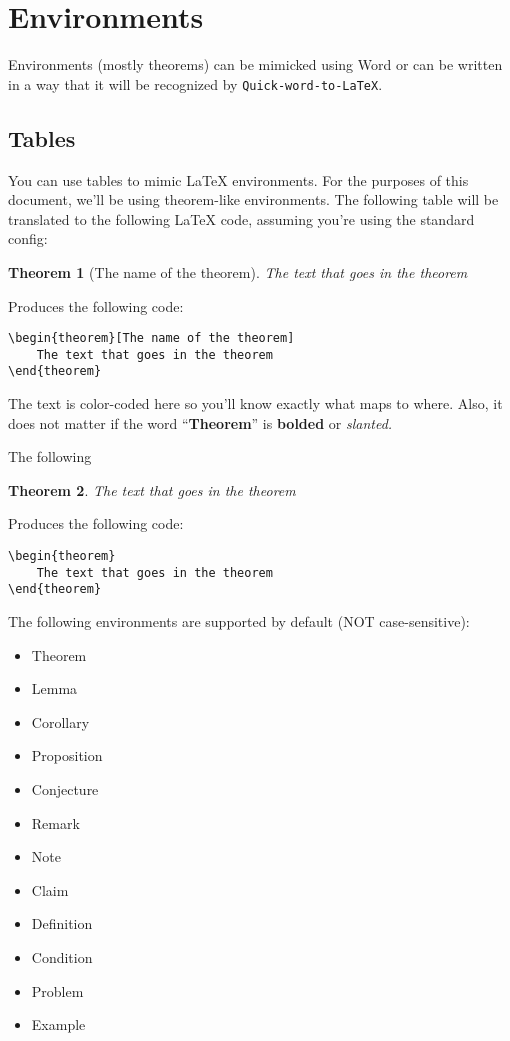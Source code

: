 \documentclass[12pt]{article}
\theoremstyle{plain}
\newtheorem{theorem}{Theorem}[section]
\theoremstyle{remark}
\theoremstyle{definition}
\begin{document}
\section{Environments}

Environments (mostly theorems) can be mimicked using Word or can be
written in a way that it will be recognized by
\texttt{Quick-word-to-LaTeX}.


\subsection{Tables}

You can use tables to mimic LaTeX environments. For the purposes of this
document, we'll be using theorem-like environments. The following table
will be translated to the following LaTeX code, assuming you're using
the standard config:

\begin{theorem}[The name of the theorem]

The text that goes in the theorem
\end{theorem}

Produces the following code:

\begin{verbatim}
\begin{theorem}[The name of the theorem]
    The text that goes in the theorem
\end{theorem}
\end{verbatim}

The text is color-coded here so you'll know exactly what maps to where.
Also, it does not matter if the word ``\textbf{Theorem}'' is
\textbf{bolded} or \emph{slanted.}

The following

\begin{theorem}

The text that goes in the theorem
\end{theorem}

Produces the following code:

\begin{verbatim}
\begin{theorem}
    The text that goes in the theorem
\end{theorem}
\end{verbatim}

The following environments are supported by default (NOT
case-sensitive):

\begin{itemize}
\item
  Theorem
\item
  Lemma
\item
  Corollary
\item
  Proposition
\item
  Conjecture
\item
  Remark
\item
  Note
\item
  Claim
\item
  Definition
\item
  Condition
\item
  Problem
\item
  Example
\end{itemize}
\end{document}
